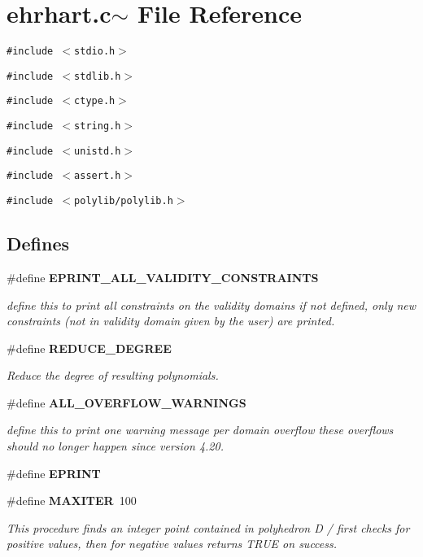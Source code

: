 \section{ehrhart.c$\sim$ File Reference}
\label{ehrhart_8c~}
{\tt \#include $<$stdio.h$>$}\par
{\tt \#include $<$stdlib.h$>$}\par
{\tt \#include $<$ctype.h$>$}\par
{\tt \#include $<$string.h$>$}\par
{\tt \#include $<$unistd.h$>$}\par
{\tt \#include $<$assert.h$>$}\par
{\tt \#include $<$polylib/polylib.h$>$}\par
\subsection*{Defines}
\begin{CompactItemize}
\item 
\#define {\bf EPRINT\_\-ALL\_\-VALIDITY\_\-CONSTRAINTS}
\begin{CompactList}\small\item\em define this to print all constraints on the validity domains if not defined, only new constraints (not in validity domain given by the user) are printed.\item\end{CompactList}\item 
\#define {\bf REDUCE\_\-DEGREE}
\begin{CompactList}\small\item\em Reduce the degree of resulting polynomials.\item\end{CompactList}\item 
\#define {\bf ALL\_\-OVERFLOW\_\-WARNINGS}
\begin{CompactList}\small\item\em define this to print one warning message per domain overflow these overflows should no longer happen since version 4.20.\item\end{CompactList}\item 
\#define {\bf EPRINT}
\item 
\#define {\bf MAXITER}\ 100
\begin{CompactList}\small\item\em This procedure finds an integer point contained in polyhedron D / first checks for positive values, then for negative values returns TRUE on success.\item\end{CompactList}\end{CompactItemize}
